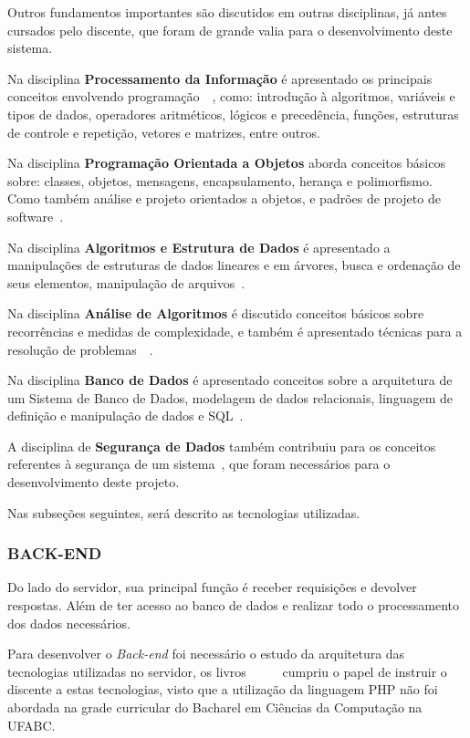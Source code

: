 \documentclass[
  12pt,				%
  openany,
  oneside,
  a4paper,			%
  english,			%
  brazil
]{article}
\numberwithin{figure}{section}
\numberwithin{table}{section}
\begin{document}
Outros fundamentos importantes são discutidos em outras disciplinas, já antes cursados pelo discente, que foram de grande valia para o desenvolvimento deste sistema.

Na disciplina \textbf{Processamento da Informação} é apresentado os principais conceitos envolvendo programação~\cite{BCC1}~\cite{BCC2}, como: introdução à algoritmos, variáveis e tipos de dados, operadores aritméticos, lógicos e precedência, funções, estruturas de controle e repetição, vetores e matrizes, entre outros.

Na disciplina \textbf{Programação Orientada a Objetos} aborda conceitos básicos sobre: classes, objetos, mensagens, encapsulamento, herança e polimorfismo. Como também análise e projeto orientados a objetos, e padrões de projeto de software~\cite{POO_deitel}.

Na disciplina \textbf{Algoritmos e Estrutura de Dados} é apresentado a  manipulações de estruturas de dados lineares e em árvores, busca e ordenação de seus elementos, manipulação de arquivos~\cite{AED_cormen1}.

Na disciplina \textbf{Análise de Algoritmos} é discutido conceitos básicos sobre recorrências e medidas de complexidade, e também é apresentado técnicas para a resolução de problemas~\cite{AED_cormen1}~\cite{AED_cormen2}.

Na disciplina \textbf{Banco de Dados} é apresentado conceitos sobre a arquitetura de um Sistema de Banco de Dados, modelagem de dados relacionais, linguagem de definição e manipulação de dados e SQL~\cite{BD}.

A disciplina de \textbf{Segurança de Dados} também contribuiu para os conceitos referentes à segurança de um sistema~\cite{SegDados}, que foram necessários para o desenvolvimento deste projeto.

Nas subseções seguintes, será descrito as tecnologias utilizadas.

\subsubsection{BACK-END}
Do lado do servidor, sua principal função é receber requisições e devolver respostas. Além de ter acesso ao banco de dados e realizar todo o processamento dos dados necessários.

Para desenvolver o \textit{Back-end} foi necessário o estudo da arquitetura das tecnologias utilizadas no servidor, os livros~\cite{PHP_Novatec_poo}~\cite{PHP_Novatec_dev}~\cite{PHP_Novatec_appWeb}~\cite{PHP_mysql}~\cite{PHP_Novatec_ajax} cumpriu o papel de instruir o discente a estas tecnologias, visto que a utilização da linguagem PHP não foi abordada na grade curricular do Bacharel em Ciências da Computação na UFABC.
\end{document}
